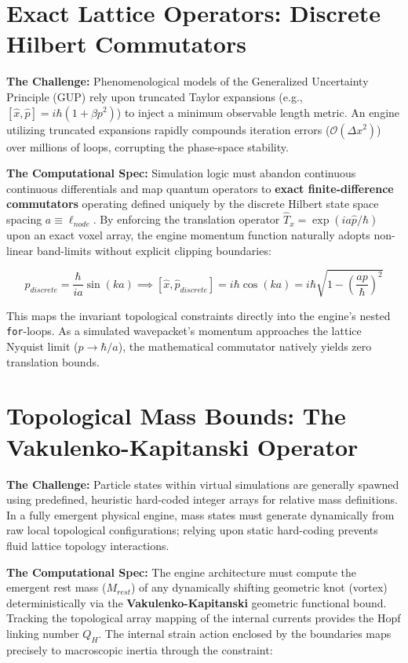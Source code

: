 \section{Exact Lattice Operators: Discrete Hilbert Commutators}

\textbf{The Challenge:} Phenomenological models of the Generalized Uncertainty Principle (GUP) rely upon truncated Taylor expansions (e.g., $[\hat{x}, \hat{p}] = i\hbar(1 + \beta p^2)$) to inject a minimum observable length metric. An engine utilizing truncated expansions rapidly compounds iteration errors ($\mathcal{O}(\Delta x^2)$) over millions of loops, corrupting the phase-space stability.

\textbf{The Computational Spec:} Simulation logic must abandon continuous continuous differentials and map quantum operators to \textbf{exact finite-difference commutators} operating defined uniquely by the discrete Hilbert state space spacing $a \equiv \ell_{node}$. By enforcing the translation operator $\hat{T}_x = \exp(i a \hat{p} / \hbar)$ upon an exact voxel array, the engine momentum function naturally adopts non-linear band-limits without explicit clipping boundaries:

\begin{equation}
    \hat{p}_{discrete} = \frac{\hbar}{i a} \sin(k a) \implies [\hat{x}, \hat{p}_{discrete}] = i\hbar \cos(k a) = i\hbar \sqrt{1 - \left(\frac{a p}{\hbar}\right)^2}
\end{equation}

This maps the invariant topological constraints directly into the engine's nested \texttt{for}-loops. As a simulated wavepacket's momentum approaches the lattice Nyquist limit ($p \to \hbar/a$), the mathematical commutator natively yields zero translation bounds.

\section{Topological Mass Bounds: The Vakulenko-Kapitanski Operator}

\textbf{The Challenge:} Particle states within virtual simulations are generally spawned using predefined, heuristic hard-coded integer arrays for relative mass definitions. In a fully emergent physical engine, mass states must generate dynamically from raw local topological configurations; relying upon static hard-coding prevents fluid lattice topology interactions.

\textbf{The Computational Spec:} The engine architecture must compute the emergent rest mass ($M_{rest}$) of any dynamically shifting geometric knot (vortex) deterministically via the \textbf{Vakulenko-Kapitanski} geometric functional bound. Tracking the topological array mapping of the internal currents provides the Hopf linking number $Q_H$. The internal strain action enclosed by the boundaries maps precisely to macroscopic inertia through the constraint:

